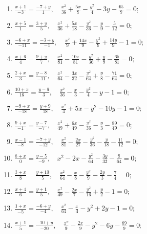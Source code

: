 	\begin{enumerate}
		\setcounter{enumi}{\value{tasks}}

			\item \( \displaystyle \frac{x+1}{-3} = \frac{-7+y}{1}, \quad \frac{x^2}{36} + \frac{5 x}{9} - \frac{y^2}{4} - 3 y - \frac{65}{9} = 0 \);
			\item \( \displaystyle \frac{x+5}{1} = \frac{3+y}{5}, \quad \frac{x^2}{36} + \frac{5 x}{18} - \frac{y^2}{36} - \frac{y}{9} - \frac{5}{12} = 0 \);
			\item \( \displaystyle \frac{-6+x}{-11} = \frac{-3+y}{-1}, \quad \frac{x^2}{9} + \frac{14 x}{9} - \frac{y^2}{9} + \frac{14 y}{9} - 1 = 0 \);
			\item \( \displaystyle \frac{x+6}{4} = \frac{9+y}{7}, \quad \frac{x^2}{81} - \frac{10 x}{81} - \frac{y^2}{36} + \frac{y}{9} - \frac{65}{81} = 0 \);
			\item \( \displaystyle \frac{2+x}{3} = \frac{y-8}{-11}, \quad \frac{x^2}{64} - \frac{3 x}{32} - \frac{y^2}{64} + \frac{y}{8} - \frac{71}{64} = 0 \);
			\item \( \displaystyle \frac{10+x}{16} = \frac{y-6}{3}, \quad \frac{x^2}{36} - \frac{x}{3} - \frac{y^2}{4} - y - 1 = 0 \);
			\item \( \displaystyle \frac{-9+x}{-18} = \frac{y+9}{18}, \quad \frac{x^2}{4} + 5 x - y^2 - 10 y - 1 = 0 \);
			\item \( \displaystyle \frac{9+x}{-1} = \frac{y-7}{-7}, \quad \frac{x^2}{49} + \frac{6 x}{49} - \frac{y^2}{36} - \frac{y}{3} - \frac{89}{49} = 0 \);
			\item \( \displaystyle \frac{x-1}{-8} = \frac{-7+y}{-12}, \quad \frac{x^2}{81} - \frac{2 x}{27} - \frac{y^2}{36} - \frac{y}{18} - \frac{11}{12} = 0 \);
			\item \( \displaystyle \frac{8+x}{0} = \frac{y-5}{-9}, \quad x^2 - 2 x - \frac{y^2}{64} - \frac{3 y}{32} - \frac{9}{64} = 0 \);
			\item \( \displaystyle \frac{3+x}{8} = \frac{y+10}{5}, \quad \frac{x^2}{64} - \frac{x}{8} - \frac{y^2}{9} - \frac{2 y}{3} - \frac{7}{4} = 0 \);
			\item \( \displaystyle \frac{x+4}{6} = \frac{y+1}{5}, \quad \frac{x^2}{49} - \frac{2 x}{7} - \frac{y^2}{16} + \frac{y}{2} - 1 = 0 \);
			\item \( \displaystyle \frac{1+x}{-5} = \frac{-6+y}{-4}, \quad \frac{x^2}{64} - \frac{x}{4} - y^2 + 2 y - 1 = 0 \);
			\item \( \displaystyle \frac{x+1}{5} = \frac{-10+y}{-20}, \quad \frac{x^2}{9} - \frac{2 x}{9} - y^2 - 6 y - \frac{89}{9} = 0 \);

\end{enumerate}
